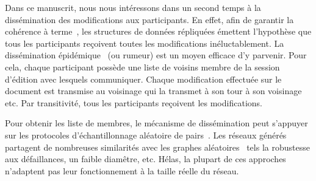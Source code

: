 Dans ce manuscrit, nous nous intéressons dans un second temps à la dissémination
des modifications aux participants. En effet, afin de garantir la cohérence à
terme~\cite{bailis2013eventual}, les structures de données répliquées émettent
l'hypothèse que tous les participants reçoivent toutes les modifications
inéluctablement. La dissémination épidémique~\cite{birman1999bimodal,
demers1987epidemic, eugster2003lightweight} (ou rumeur) est un moyen efficace
d'y parvenir. Pour cela, chaque participant possède une liste de voisins membre
de la session d'édition avec lesquels communiquer. Chaque modification effectuée
sur le document est transmise au voisinage qui la transmet à son tour à son
voisinage etc. Par transitivité, tous les participants reçoivent les
modifications.

Pour obtenir les liste de membres, le mécanisme de dissémination peut s'appuyer
sur les protocoles d'échantillonnage aléatoire de
pairs~\cite{eugster2003lightweight, ganesh2001scamp, jelasity2007gossip,
tolgyeski2009adaptive, voulgaris2005cyclon}. Les réseaux générés partagent de
nombreuses similarités avec les graphes aléatoires~\cite{erdos1959random} tels
la robustesse aux défaillances, un faible diamêtre, etc. Hélas, la plupart de
ces approches n'adaptent pas leur fonctionnement à la taille réelle du réseau.

